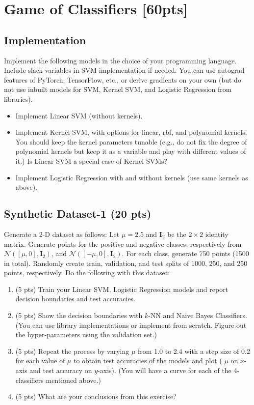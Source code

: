 \documentclass[a4paper]{article}
\theoremstyle{definition}
\begin{document}
\section{Game of Classifiers [60pts]}
\subsection{Implementation}
Implement the following models in the choice of your programming language. Include slack variables in SVM implementation if needed. You can use autograd features of PyTorch, TensorFlow, etc., or derive gradients on your own (but do not use inbuilt models for SVM, Kernel SVM, and Logistic Regression from libraries).
\begin{itemize}
    \item Implement Linear SVM (without kernels).
    \item Implement Kernel SVM, with options for linear, rbf, and polynomial kernels. You should keep the kernel parameters tunable (e.g., do not fix the degree of polynomial kernels but keep it as a variable and play with different values of it.) Is Linear SVM a special case of Kernel SVMs?
\item Implement Logistic Regression with and without kernels (use same kernels as above).
\end{itemize}
\subsection{ Synthetic Dataset-1 (20 pts)}
Generate a 2-D dataset as follows:
Let $\mu = 2.5$ and $\mathbf I_2$ be the $2 \times 2$ identity matrix. Generate points for the positive and negative classes, respectively
from $\mathcal{N} ([\mu, 0], \mathbf I_2)$, and $\mathcal{N} ([-\mu, 0], \mathbf I_2)$. For each class, generate 750 points (1500 in total). Randomly create train, validation, and test splits of 1000, 250, and 250 points, respectively. Do the following with this dataset:
\begin{enumerate}
    \item  (5 pts) Train your Linear SVM, Logistic Regression models and report decision boundaries and test accuracies.

\item (5 pts) Show the decision boundaries with $k$-NN and Naive Bayes Classifiers. (You can use library implementations or implement from scratch. Figure out the hyper-parameters using the validation set.)

\item (5 pts) Repeat the process by varying $\mu$ from 1.0 to 2.4 with a step size of 0.2 for each value of $\mu$ to obtain test
accuracies of the models and plot ( $\mu$ on $x$-axis and test accuracy on $y$-axis). (You will have a curve for
each of the 4-classifiers mentioned above.)
\item (5 pts) What are your conclusions from this exercise?
\end{enumerate}
\end{document}
